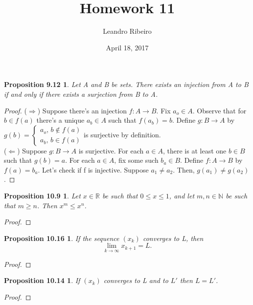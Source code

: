 \documentclass[12pt]{amsart}
\newcommand{\N}{\mathbb{N}}
\newcommand{\R}{\mathbb{R}}
\begin{document}
\title{Homework 11}
\date{April 18, 2017}
\author{Leandro Ribeiro}

\maketitle

\newtheorem*{prop9.12}{Proposition 9.12}

\begin{prop9.12}
	Let A and B be sets. There exists an injection from A to B if and only if there exists a surjection from B to A.
\end{prop9.12}
\begin{proof}
	($\Rightarrow$) Suppose there's an injection $f: A \rightarrow B$. Fix $a_{o} \in A$. Observe that for $b \in f(a)$ there's a unique $a_b \in A$ such that $f(a_b) = b$. Define $g: B \rightarrow A$ by $g(b) =\begin{cases}
		a_o \textrm{,  }b \notin f(a)\\
		a_b \textrm{,  }b \in f(a) 
	\end{cases}$is surjective by definition.
	\\\indent($\Leftarrow$) Suppose $g: B \rightarrow A$ is surjective. For each $a \in A$, there is at least one $b \in B$ such that $g(b) =  a$. For each $a \in A$, fix some such $b_a \in B$. Define $f: A \rightarrow B$ by $f(a) = b_a$. Let's check if f is injective. Suppose $a_1 \neq a_2$. Then, $g(a_1) \neq g(a_2)$.
\end{proof}

\newtheorem*{prop10.9}{Proposition 10.9}
\begin{prop10.9}
	Let $x \in \R$ be such that $0 \leq x \leq 1$, and let $m, n \in \N$ be such that $m \geq n$. Then $x^{m} \leq x^{n}$.
\end{prop10.9}

\begin{proof}
\end{proof}

\newtheorem*{prop10.16}{Proposition 10.16}
\begin{prop10.16}
	If the sequence $(x_k)$ converges to L, then $$\lim_{k \to \infty} x_{k+1} = L.$$
\end{prop10.16}

\begin{proof}
\end{proof}

\newtheorem*{prop10.14}{Proposition 10.14}
\begin{prop10.14}
	If $(x_k)$ converges to L and to $L'$ then $L = L'$.
\end{prop10.14}

\begin{proof}
\end{proof}
\end{document}
